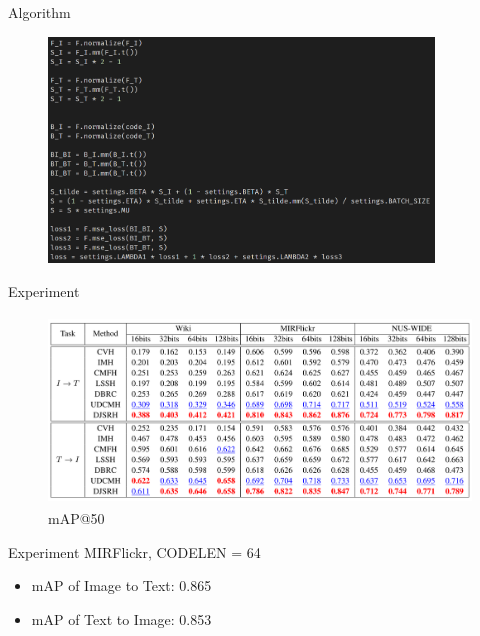 \documentclass[serif]{beamer}
\begin{document}
\begin{frame}{Algorithm}
\begin{figure}
    \includegraphics[height=6cm]{4.PNG}
\end{figure}
\end{frame}

\begin{frame}{Experiment}
\begin{figure}
    \includegraphics[height=5cm]{5.PNG}
	\caption{mAP@50}
\end{figure}
\end{frame}

\begin{frame}{Experiment}
MIRFlickr, CODELEN = 64
\begin{itemize}
	\item mAP of Image to Text: 0.865
	\item mAP of Text to Image: 0.853
\end{itemize}
\end{frame}
\end{document}
